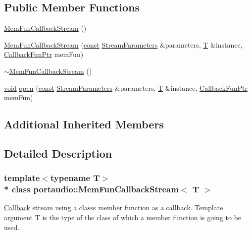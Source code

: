 \subsection*{Public Member Functions}
\begin{DoxyCompactItemize}
\item 
\hyperlink{classportaudio_1_1_mem_fun_callback_stream_a41ac619da3a7fd9ba3fbae9df1499f91}{Mem\+Fun\+Callback\+Stream} ()
\item 
\hyperlink{classportaudio_1_1_mem_fun_callback_stream_a0467ef8d4596114c3f09fed95aff8894}{Mem\+Fun\+Callback\+Stream} (\hyperlink{getopt1_8c_a2c212835823e3c54a8ab6d95c652660e}{const} \hyperlink{classportaudio_1_1_stream_parameters}{Stream\+Parameters} \&parameters, \hyperlink{xmltchar_8h_a16a0f7e7053a679c9bf4289b441a2be7}{T} \&instance, \hyperlink{classportaudio_1_1_mem_fun_callback_stream_a429144c3e6505f0aebb61df638048027}{Callback\+Fun\+Ptr} mem\+Fun)
\item 
\hyperlink{classportaudio_1_1_mem_fun_callback_stream_ae5407ed9c4e4774ab1e4ddaaadae346b}{$\sim$\+Mem\+Fun\+Callback\+Stream} ()
\item 
\hyperlink{sound_8c_ae35f5844602719cf66324f4de2a658b3}{void} \hyperlink{classportaudio_1_1_mem_fun_callback_stream_a60560038df847067e522d76f683d724d}{open} (\hyperlink{getopt1_8c_a2c212835823e3c54a8ab6d95c652660e}{const} \hyperlink{classportaudio_1_1_stream_parameters}{Stream\+Parameters} \&parameters, \hyperlink{xmltchar_8h_a16a0f7e7053a679c9bf4289b441a2be7}{T} \&instance, \hyperlink{classportaudio_1_1_mem_fun_callback_stream_a429144c3e6505f0aebb61df638048027}{Callback\+Fun\+Ptr} mem\+Fun)
\end{DoxyCompactItemize}
\subsection*{Additional Inherited Members}


\subsection{Detailed Description}
\subsubsection*{template$<$typename T$>$\\*
class portaudio\+::\+Mem\+Fun\+Callback\+Stream$<$ T $>$}

\hyperlink{class_callback}{Callback} stream using a class\textquotesingle{}s member function as a callback. Template argument T is the type of the class of which a member function is going to be used. 

